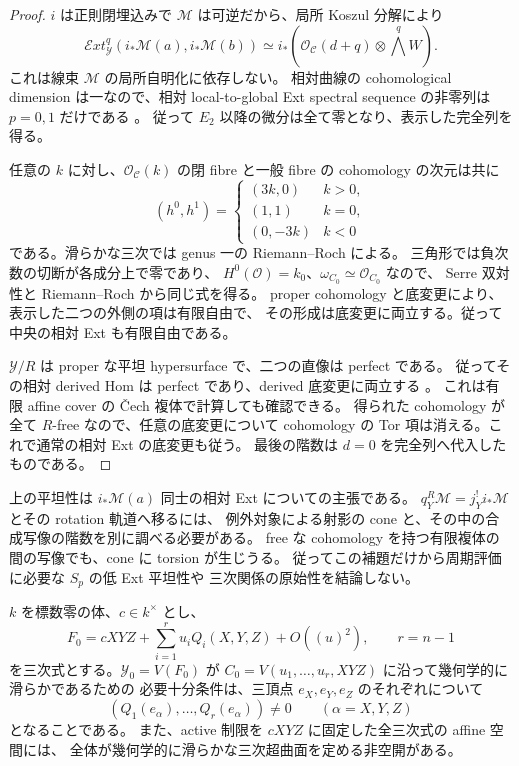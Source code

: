\begin{proof}
$i$ は正則閉埋込みで $\mathcal M$ は可逆だから、局所 Koszul 分解により
\[
 \mathcal Ext^q_{\mathcal Y}
       (i_*\mathcal M(a),i_*\mathcal M(b))
 \simeq i_*\!\left(
       \mathcal O_{\mathcal C}(d+q)\otimes\bigwedge^qW\right).
\]
これは線束 $\mathcal M$ の局所自明化に依存しない。
相対曲線の cohomological dimension は一なので、相対 local-to-global
Ext spectral sequence の非零列は $p=0,1$ だけである
\cite[Tag~0BQP]{NFMStacksRelativeExt}。
従って $E_2$ 以降の微分は全て零となり、表示した完全列を得る。

任意の $k$ に対し、$\mathcal O_{\mathcal C}(k)$ の閉 fibre と一般 fibre の
cohomology の次元は共に
\[
 (h^0,h^1)=
 \begin{cases}
 (3k,0)&k>0,\\
 (1,1)&k=0,\\
 (0,-3k)&k<0
 \end{cases}
\]
である。滑らかな三次では genus 一の Riemann--Roch による。
三角形では負次数の切断が各成分上で零であり、
$H^0(\mathcal O)=k_0$、$\omega_{C_0}\simeq\mathcal O_{C_0}$ なので、
Serre 双対性と Riemann--Roch から同じ式を得る。
proper cohomology と底変更により、表示した二つの外側の項は有限自由で、
その形成は底変更に両立する。従って中央の相対 Ext も有限自由である。

$\mathcal Y/R$ は proper な平坦 hypersurface で、二つの直像は perfect である。
従ってその相対 derived Hom は perfect であり、derived 底変更に両立する
\cite[Lemma~36.30.1]{NFMStacksRelativeExt}。
これは有限 affine cover の \v{C}ech 複体で計算しても確認できる。
得られた cohomology が全て $R$-free なので、任意の底変更について
cohomology の Tor 項は消える。これで通常の相対 Ext の底変更も従う。
最後の階数は $d=0$ を完全列へ代入したものである。
\end{proof}

\begin{remark}
上の平坦性は $i_*\mathcal M(a)$ 同士の相対 Ext についての主張である。
$q_Y^R\mathcal M=j_Y^!i_*\mathcal M$ とその rotation 軌道へ移るには、
例外対象による射影の cone と、その中の合成写像の階数を別に調べる必要がある。
free な cohomology を持つ有限複体の間の写像でも、cone に torsion が生じうる。
従ってこの補題だけから周期評価に必要な $S_p$ の低 Ext 平坦性や
三次関係の原始性を結論しない。
\end{remark}

\begin{lemma}[三角形切断に沿う滑らかさの有限判定]
\label{lem:nfm-hesse-boundary-transverse-smoothness}
$k$ を標数零の体、$c\in k^\times$ とし、
\[
 F_0=cXYZ+\sum_{i=1}^r u_iQ_i(X,Y,Z)+O((u)^2),
 \qquad r=n-1
\]
を三次式とする。$\mathcal Y_0=V(F_0)$ が
$C_0=V(u_1,\ldots,u_r,XYZ)$ に沿って幾何学的に滑らかであるための
必要十分条件は、三頂点 $e_X,e_Y,e_Z$ のそれぞれについて
\[
 (Q_1(e_\alpha),\ldots,Q_r(e_\alpha))\ne0
 \qquad(\alpha=X,Y,Z)
\]
となることである。
また、active 制限を $cXYZ$ に固定した全三次式の affine 空間には、
全体が幾何学的に滑らかな三次超曲面を定める非空開がある。
\end{lemma}

